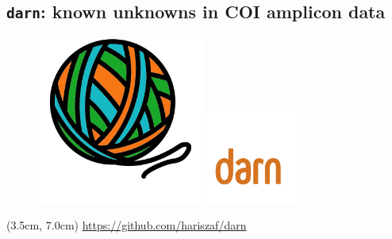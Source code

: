 \documentclass{beamer}
\begin{document}
   \begin{darkframes}
      \subsection{\texttt{darn}: known unknowns in COI amplicon data}
      \begin{frame}
         \begin{figure}
            \includegraphics[width=55mm]{resources/darn_logo.png}
            \includegraphics[width=30mm]{../met_nets/resources/darn-logo-text.png}
         \end{figure}

         \begin{textblock*}{7cm}(3.5cm, 7.0cm)
            \href{https://github.com/hariszaf/darn}{https://github.com/hariszaf/darn}
         \end{textblock*}

      \end{frame}
   \end{darkframes}


\end{document}
